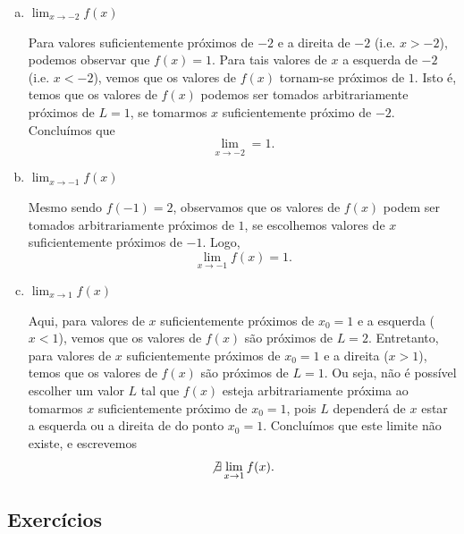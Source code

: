 \begin{resol}
  \begin{enumerate}[a)]
  \item $\displaystyle \lim_{x\to -2} f(x)$

    Para valores suficientemente próximos de $-2$ e a direita de $-2$ (i.e. $x>-2$), podemos observar que $f(x)=1$. Para tais valores de $x$ a esquerda de $-2$ (i.e. $x<-2$), vemos que os valores de $f(x)$ tornam-se próximos de $1$. Isto é, temos que os valores de $f(x)$ podemos ser tomados arbitrariamente próximos de $L=1$, se tomarmos $x$ suficientemente próximo de $-2$. Concluímos que
    \begin{equation}
      \lim_{x\to -2} = 1.
    \end{equation}

  \item $\displaystyle \lim_{x\to -1} f(x)$

    Mesmo sendo $f(-1)=2$, observamos que os valores de $f(x)$ podem ser tomados arbitrariamente próximos de $1$, se escolhemos valores de $x$ suficientemente próximos de $-1$. Logo,
    \begin{equation}
      \lim_{x\to -1} f(x) = 1.
    \end{equation}

    \item $\displaystyle \lim_{x\to 1} f(x)$

      Aqui, para valores de $x$ suficientemente próximos de $x_0=1$ e a esquerda ($x<1$), vemos que os valores de $f(x)$ são próximos de $L=2$. Entretanto, para valores de $x$ suficientemente próximos de $x_0=1$ e a direita ($x>1$), temos que os valores de $f(x)$ são próximos de $L=1$. Ou seja, não é possível escolher um valor $L$ tal que $f(x)$ esteja arbitrariamente próxima ao tomarmos $x$ suficientemente próximo de $x_0=1$, pois $L$ dependerá de $x$ estar a esquerda ou a direita de do ponto $x_0 = 1$. Concluímos que este limite não existe, e escrevemos
      \begin{equation}
        \not\exists\lim_{x\to 1} f(x).
      \end{equation}
  \end{enumerate}
\end{resol}

\subsection*{Exercícios}

